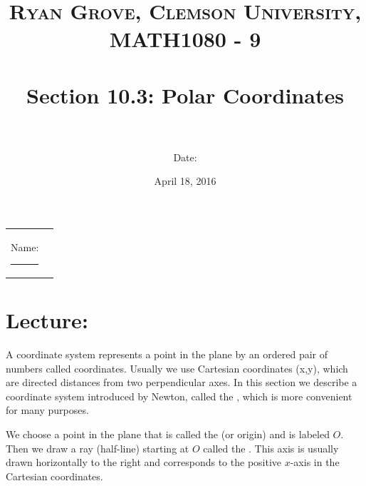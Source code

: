 \documentclass[paper=a4, fontsize=11pt]{scrartcl} %
\title{	
\normalfont \normalsize 
\textsc{Ryan Grove, Clemson University, MATH1080 - 9} \\ [25pt] %
\horrule{0.5pt} \\[0.4cm] %
\huge Section 10.3: Polar Coordinates  \\ %
\horrule{2pt} \\[0.5cm] %
}
\author{Date:} %
\date{\normalsize April 18, 2016} %
\numberwithin{equation}{section} %
\numberwithin{figure}{section} %
\numberwithin{table}{section} %
\begin{document}
\maketitle %

\begin{flushleft}
\begin{tabular}{l l}
Name: \rule{3.2in}{.01cm}  & {}%
\end{tabular}
\end{flushleft}


\section*{\textbf{Lecture:}}

A coordinate system represents a point in the plane by an ordered pair of numbers called coordinates. Usually we use Cartesian coordinates (x,y), which are directed distances from two perpendicular axes. In this section we describe a coordinate system introduced by Newton, called the \underline{\hspace{1in}} \underline{\hspace{1.25in}} \underline{\hspace{1in}}, which is more convenient for many purposes.\\
\indent

We choose a point in the plane that is called the \underline{\hspace{0.75in}} (or origin) and is labeled $O$. Then we draw a ray (half-line) starting at $O$ called the \underline{\hspace{1in}} \underline{\hspace{0.75in}}. This axis is usually drawn horizontally to the right and corresponds to the positive $x$-axis in the Cartesian coordinates.\\
\indent
\end{document}
